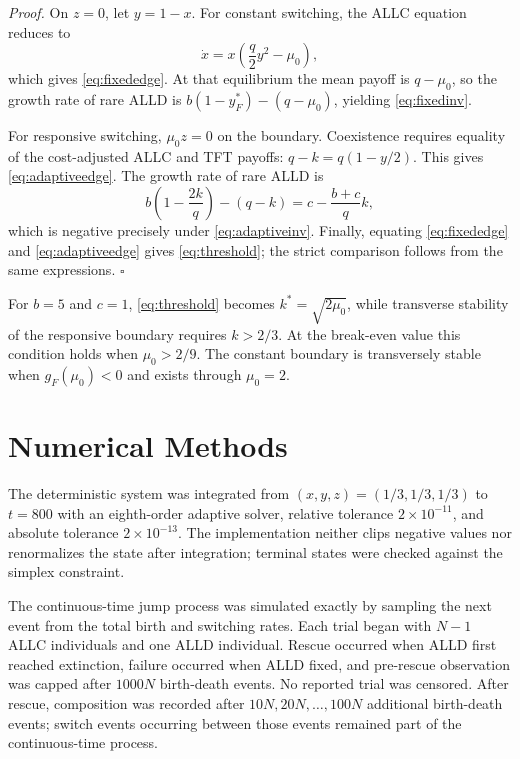 \documentclass[pdflatex,sn-mathphys-ay]{sn-jnl}
\theoremstyle{thmstyleone}
\begin{document}
\noindent\emph{Proof.}
On $z=0$, let $y=1-x$. For constant switching, the ALLC equation reduces to
\begin{equation}
\dot x=x\left(\frac{q}{2}y^2-\mu_0\right),
\end{equation}
which gives \eqref{eq:fixededge}. At that equilibrium the mean payoff is $q-\mu_0$, so the growth rate of rare ALLD is $b(1-y_F^*)-(q-\mu_0)$, yielding \eqref{eq:fixedinv}.

For responsive switching, $\mu_0z=0$ on the boundary. Coexistence requires equality of the cost-adjusted ALLC and TFT payoffs: $q-k=q(1-y/2)$. This gives \eqref{eq:adaptiveedge}. The growth rate of rare ALLD is
\begin{equation}
b\left(1-\frac{2k}{q}\right)-(q-k)
=c-\frac{b+c}{q}k,
\end{equation}
which is negative precisely under \eqref{eq:adaptiveinv}. Finally, equating \eqref{eq:fixededge} and \eqref{eq:adaptiveedge} gives \eqref{eq:threshold}; the strict comparison follows from the same expressions. \hfill$\square$

For $b=5$ and $c=1$, \eqref{eq:threshold} becomes $k^*=\sqrt{2\mu_0}$, while transverse stability of the responsive boundary requires $k>2/3$. At the break-even value this condition holds when $\mu_0>2/9$. The constant boundary is transversely stable when $g_F(\mu_0)<0$ and exists through $\mu_0=2$.

\section{Numerical Methods}

The deterministic system was integrated from $(x,y,z)=(1/3,1/3,1/3)$ to $t=800$ with an eighth-order adaptive solver, relative tolerance $2\times10^{-11}$, and absolute tolerance $2\times10^{-13}$. The implementation neither clips negative values nor renormalizes the state after integration; terminal states were checked against the simplex constraint.

The continuous-time jump process was simulated exactly by sampling the next event from the total birth and switching rates. Each trial began with $N-1$ ALLC individuals and one ALLD individual. Rescue occurred when ALLD first reached extinction, failure occurred when ALLD fixed, and pre-rescue observation was capped after $1000N$ birth-death events. No reported trial was censored. After rescue, composition was recorded after $10N,20N,\ldots,100N$ additional birth-death events; switch events occurring between those events remained part of the continuous-time process.
\end{document}
